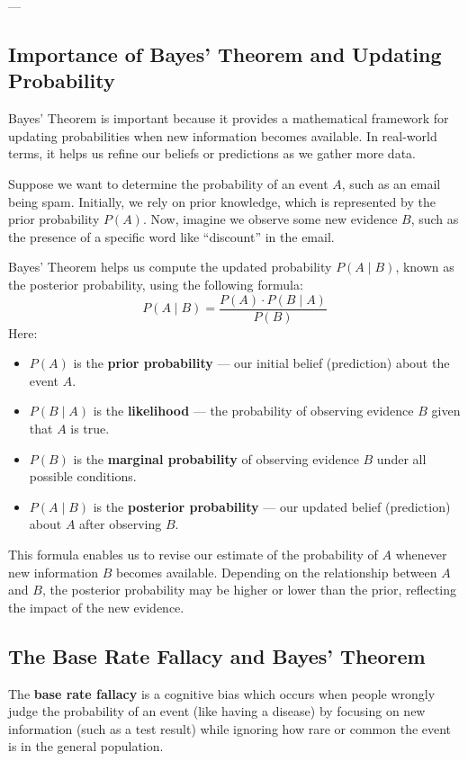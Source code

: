 \documentclass[twoside]{book}
\begin{document}
---

\subsection{Importance of Bayes' Theorem and Updating Probability}

Bayes’ Theorem is important because it provides a mathematical framework for updating probabilities when new information becomes available. In real-world terms, it helps us refine our beliefs or predictions as we gather more data.

Suppose we want to determine the probability of an event \( A \), such as an email being spam. Initially, we rely on prior knowledge, which is represented by the prior probability \( P(A) \). Now, imagine we observe some new evidence \( B \), such as the presence of a specific word like ``discount'' in the email.

Bayes' Theorem helps us compute the updated probability \( P(A \mid B) \), known as the posterior probability, using the following formula:
\[
P(A \mid B) = \frac{P(A) \cdot P(B \mid A)}{P(B)}
\]
Here:
\begin{itemize}
    \item \( P(A) \) is the \textbf{prior probability} — our initial belief (prediction) about the event \( A \).
    \item \( P(B \mid A) \) is the \textbf{likelihood} — the probability of observing evidence \( B \) given that \( A \) is true.
    \item \( P(B) \) is the \textbf{marginal probability} of observing evidence \( B \) under all possible conditions.
    \item \( P(A \mid B) \) is the \textbf{posterior probability} — our updated belief (prediction)  about \( A \) after observing \( B \).
\end{itemize}

This formula enables us to revise our estimate of the probability of \( A \) whenever new information \( B \) becomes available. Depending on the relationship between \( A \) and \( B \), the posterior probability may be higher or lower than the prior, reflecting the impact of the new evidence.

\subsection{The Base Rate Fallacy and Bayes' Theorem}

\begin{textbox}
The \textbf{base rate fallacy} is a cognitive bias which occurs when people wrongly judge the probability of an event (like having a disease) by focusing on new information (such as a test result) while ignoring how rare or common the event is in the general population.
\end{textbox}
\end{document}
